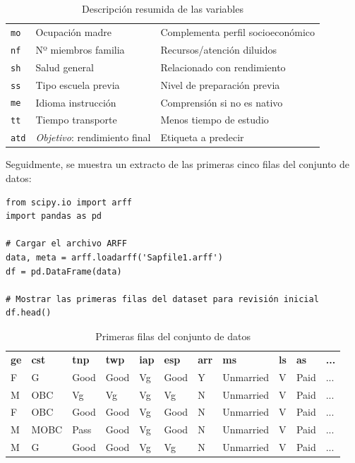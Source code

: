 \documentclass[11pt,a4paper]{article}
\begin{document}
\begin{table}[H]
\begin{tabularx}{\textwidth}{|l|X|X|}
\texttt{mo} & Ocupación madre & Complementa perfil socioeconómico \\
\texttt{nf} & Nº miembros familia & Recursos/atención diluidos \\
\texttt{sh} & Salud general & Relacionado con rendimiento \\
\texttt{ss} & Tipo escuela previa & Nivel de preparación previa \\
\texttt{me} & Idioma instrucción & Comprensión si no es nativo \\
\texttt{tt} & Tiempo transporte & Menos tiempo de estudio \\
\texttt{atd} & \textit{Objetivo}: rendimiento final & Etiqueta a predecir \\
\hline
\end{tabularx}
\caption*{Descripción resumida de las variables}
\end{table}

\medskip

Seguidmente, se muestra un extracto de las primeras cinco filas del conjunto de datos:

\begin{verbatim}
from scipy.io import arff
import pandas as pd

# Cargar el archivo ARFF
data, meta = arff.loadarff('Sapfile1.arff')
df = pd.DataFrame(data)

# Mostrar las primeras filas del dataset para revisión inicial
df.head()
\end{verbatim}

\begin{table}[H]
\centering
\footnotesize
\begin{tabular}{lllllllllll}
\textbf{ge} & \textbf{cst} & \textbf{tnp} & \textbf{twp} & \textbf{iap} & \textbf{esp} & \textbf{arr} & \textbf{ms} & \textbf{ls} & \textbf{as} & \textbf{...} \\
F & G & Good & Good & Vg & Good & Y & Unmarried & V & Paid & ... \\
M & OBC & Vg & Vg & Vg & Vg & N & Unmarried & V & Paid & ... \\
F & OBC & Good & Good & Vg & Good & N & Unmarried & V & Paid & ... \\
M & MOBC & Pass & Good & Vg & Good & N & Unmarried & V & Paid & ... \\
M & G & Good & Good & Vg & Vg & N & Unmarried & V & Paid & ... \\
\end{tabular}
\caption*{Primeras filas del conjunto de datos}
\end{table}
\end{document}
